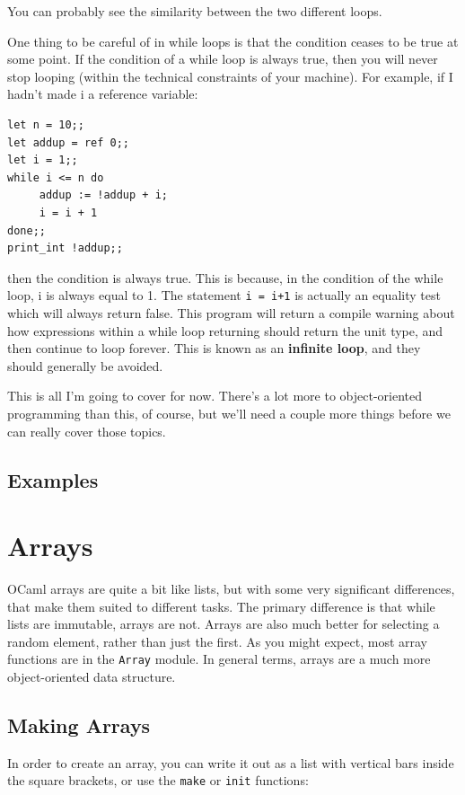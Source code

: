 \documentclass[10pt]{book}
\begin{document}
{You can probably see the similarity between the two different loops.

One thing to be careful of in while loops is that the condition ceases to be true at 
some point. If the condition of a while loop is always true, then you will never stop 
looping (within the technical constraints of your machine). For example, if I hadn't
made i a reference variable:
\beforeverb
\begin{verbatim}
let n = 10;;
let addup = ref 0;;
let i = 1;;
while i <= n do
     addup := !addup + i;
     i = i + 1
done;;
print_int !addup;;
\end{verbatim}
\afterverb
then the condition is always true. This is because, in the condition of the while loop,
i is always equal to 1. The statement {\tt i = i+1} is actually an equality test which will always
return false. This program will return a compile warning about how expressions within a while loop 
returning should return the unit type, and then continue to loop forever. This is known as
an {\bf infinite loop}, and they should generally be avoided.

This is all I'm going to cover for now. There's a lot more to object-oriented 
programming than this, of course, but we'll need a couple more things before
we can really cover those topics.

\section{Examples}


\chapter{Arrays}

OCaml arrays are quite a bit like lists, but with some very significant
differences, that make them suited to different tasks. The primary difference
is that while lists are immutable, arrays are not. Arrays are also much better
for selecting a random element, rather than just the first. As you might expect,
most array functions are in the {\tt Array} module. In general terms, arrays are 
a much more object-oriented data structure.

\section{Making Arrays}

In order to create an array, you can write it out as a list with vertical bars inside the square brackets, or use the {\tt make} or {\tt init} functions:

}
\end{document}
